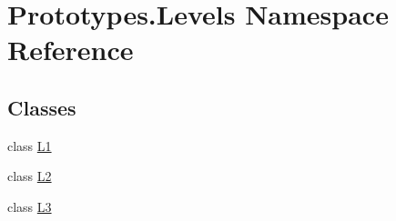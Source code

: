 \hypertarget{namespace_prototypes_1_1_levels}{}\section{Prototypes.\+Levels Namespace Reference}
\label{namespace_prototypes_1_1_levels}
\subsection*{Classes}
\begin{DoxyCompactItemize}
\item 
class \mbox{\hyperlink{class_prototypes_1_1_levels_1_1_l1}{L1}}
\item 
class \mbox{\hyperlink{class_prototypes_1_1_levels_1_1_l2}{L2}}
\item 
class \mbox{\hyperlink{class_prototypes_1_1_levels_1_1_l3}{L3}}
\end{DoxyCompactItemize}
